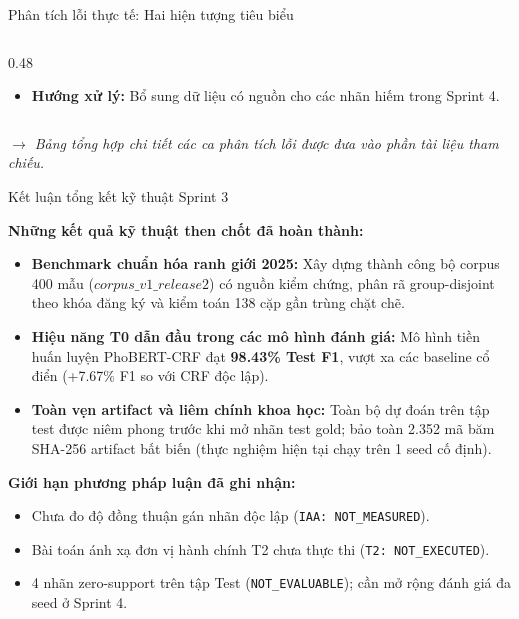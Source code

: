 \documentclass[aspectratio=169, 9pt]{beamer}
\begin{document}
\begin{frame}{Phân tích lỗi thực tế: Hai hiện tượng tiêu biểu}
\begin{columns}[T]
\begin{column}{0.48\textwidth}
{\begin{itemize}
        \item \textbf{Hướng xử lý:} Bổ sung dữ liệu có nguồn cho các nhãn hiếm trong Sprint 4.
      \end{itemize}
      }
    \end{column}
  \end{columns}
  \vspace{0.2cm}
  \begin{center}
    {\fontsize{6.8pt}{8.5pt}\selectfont\textit{\color{gray} $\to$ Bảng tổng hợp chi tiết các ca phân tích lỗi được đưa vào phần tài liệu tham chiếu.}}
  \end{center}
\end{frame}

\begin{frame}{Kết luận tổng kết kỹ thuật Sprint 3}
  \vspace{-0.1cm}
  {\fontsize{8.5pt}{11pt}\selectfont
  \textbf{Những kết quả kỹ thuật then chốt đã hoàn thành:}
  \begin{itemize}
    \setlength{\itemsep}{3.5pt}
    \item \textbf{Benchmark chuẩn hóa ranh giới 2025:} Xây dựng thành công bộ corpus 400 mẫu ($corpus\_v1\_release2$) có nguồn kiểm chứng, phân rã group-disjoint theo khóa đăng ký và kiểm toán 138 cặp gần trùng chặt chẽ.
    \item \textbf{Hiệu năng T0 dẫn đầu trong các mô hình đánh giá:} Mô hình tiền huấn luyện PhoBERT-CRF đạt \textbf{98.43\% Test F1}, vượt xa các baseline cổ điển (+7.67\% F1 so với CRF độc lập).
    \item \textbf{Toàn vẹn artifact và liêm chính khoa học:} Toàn bộ dự đoán trên tập test được niêm phong trước khi mở nhãn test gold; bảo toàn 2.352 mã băm SHA-256 artifact bất biến (thực nghiệm hiện tại chạy trên 1 seed cố định).
  \end{itemize}
  \vspace{0.12cm}
  \textbf{Giới hạn phương pháp luận đã ghi nhận:}
  \begin{itemize}
    \setlength{\itemsep}{2.5pt}
    \item Chưa đo độ đồng thuận gán nhãn độc lập (\texttt{IAA: NOT\_MEASURED}).
    \item Bài toán ánh xạ đơn vị hành chính T2 chưa thực thi (\texttt{T2: NOT\_EXECUTED}).
    \item 4 nhãn zero-support trên tập Test (\texttt{NOT\_EVALUABLE}); cần mở rộng đánh giá đa seed ở Sprint 4.
  \end{itemize}
  }
\end{frame}
\end{document}
